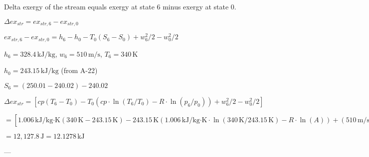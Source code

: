 Delta exergy of the stream equals exergy at state 6 minus exergy at state 0.  

\( \Delta ex_{str} = ex_{str,6} - ex_{str,0} \)  

\( ex_{str,6} - ex_{str,0} = h_6 - h_0 - T_0(S_6 - S_0) + w_6^2/2 - w_0^2/2 \)  

\( h_6 = 328.4 \, \text{kJ/kg} \), \( w_6 = 510 \, \text{m/s} \), \( T_6 = 340 \, \text{K} \)  

\( h_0 = 243.15 \, \text{kJ/kg} \) (from A-22)  

\( S_6 = (250.01 - 240.02) - 240.02 \)  

\( \Delta ex_{str} = [cp(T_6 - T_0) - T_0(cp \cdot \ln(T_6/T_0) - R \cdot \ln(p_6/p_0)) + w_6^2/2 - w_0^2/2] \)  

\( = [1.006 \, \text{kJ/kg·K}(340 \, \text{K} - 243.15 \, \text{K}) - 243.15 \, \text{K}(1.006 \, \text{kJ/kg·K} \cdot \ln(340 \, \text{K}/243.15 \, \text{K}) - R \cdot \ln(A)) + (510 \, \text{m/s})^2/2 - (200 \, \text{m/s})^2/2] \)  

\( = 12,127.8 \, \text{J} = 12.1278 \, \text{kJ} \)  

---